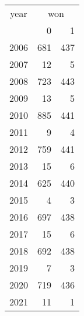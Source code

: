 \footnotesize\begin{tabular}[t]{lrr}
\toprule
\multicolumn{1}{c}{year} & \multicolumn{2}{c}{won} \\
\cmidrule(l{3pt}r{3pt}){1-1} \cmidrule(l{3pt}r{3pt}){2-3}
  & 0 & 1\\
\midrule
2006 & 681 & 437\\
2007 & 12 & 5\\
2008 & 723 & 443\\
2009 & 13 & 5\\
2010 & 885 & 441\\
2011 & 9 & 4\\
2012 & 759 & 441\\
2013 & 15 & 6\\
2014 & 625 & 440\\
2015 & 4 & 3\\
2016 & 697 & 438\\
2017 & 15 & 6\\
2018 & 692 & 438\\
2019 & 7 & 3\\
2020 & 719 & 436\\
2021 & 11 & 1\\
\bottomrule
\end{tabular}
